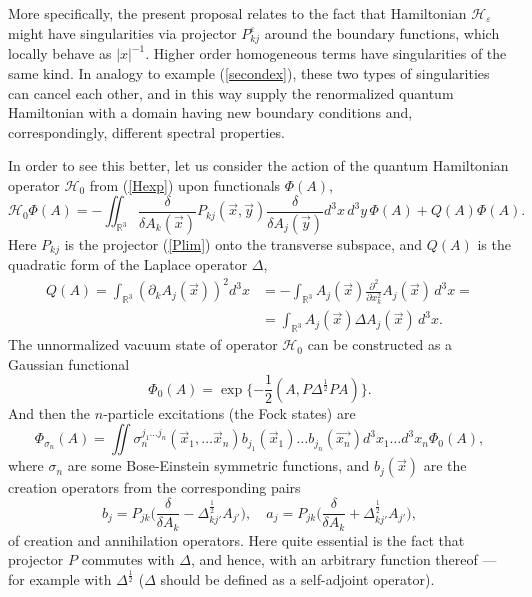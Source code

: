 \documentclass[12pt]{article}
\newcommand{\pl}{\partial}
\newcommand{\HH}{\mathscr{H}}
\newcommand{\RR}{\mathbb{R}}
\newcommand{\ve}{\varepsilon}
\begin{document}
    More specifically, the present proposal relates to the fact that    
    Hamiltonian
$ \HH_{\ve} $
	might have singularities via projector
$ P_{kj}^{\ve} $
    around the boundary functions,
	which locally behave as
$ |x|^{-1} $.
	Higher order homogeneous terms have singularities of the same kind.
	In analogy to example
(\ref{secondex}),
	these two types of singularities can cancel each other,
	and in this way supply the renormalized quantum Hamiltonian
	with a domain having new boundary conditions and, correspondingly,
	different spectral properties.

	In order to see this better, let us consider the action
	of the quantum Hamiltonian operator
$ \HH_{0} $ from
(\ref{Hexp})
	upon functionals
$ \Phi(A) $,
\begin{equation}
\label{qH0}
    \HH_{0}\Phi(A) = - \iint_{\RR^{3}} \frac{\delta}{\delta A_{k}(\vec{x})}
	P_{kj}(\vec{x},\vec{y}) \frac{\delta}{\delta A_{j}(\vec{y})}
	    d^{3}x \,d^{3}y \, \Phi(A)
	+ Q(A) \Phi(A) .
\end{equation}
	Here
$ P_{kj} $
	is the projector
(\ref{Plim})
	onto the transverse subspace, and
$ Q(A) $
	is the quadratic form of the Laplace operator
$ \Delta $,
\begin{align}
\nonumber
    Q(A) = \int_{\RR^{3}} (\pl_{k}A_{j}(\vec{x}))^{2} d^{3}x
	&= - \int_{\RR^{3}} A_{j}(\vec{x}) \frac{\pl^{2}}{\pl x_{k}^{2}}
	A_{j}(\vec{x})\, d^{3} x =\\
\label{QA}
	&= \int_{\RR^{3}} A_{j}(\vec{x}) \Delta A_{j}(\vec{x}) \, d^{3}x .
\end{align}
    The unnormalized vacuum state of operator
$ \HH_{0} $
    can be constructed as a Gaussian functional
\begin{equation}
\label{Phi0}
    \Phi_{0}(A) = \exp\{-\frac{1}{2}(A,P\Delta^{\frac{1}{2}}PA)\} .
\end{equation}
    And then the
$ n $-particle excitations (the Fock states)
    are
\begin{equation*}
\label{Phin}
    \Phi_{\sigma_{n}}(A) = \iint
    \sigma_{n}^{j_{1}\ldots j_{n}} (\vec{x}_{1},\ldots \vec{x}_{n})
	b_{j_{1}}(\vec{x}_{1}) \ldots b_{j_{n}}(\vec{x_{n}})
    d^{3}x_{1} \ldots d^{3}x_{n} \Phi_{0}(A) ,
\end{equation*}
	where
$ \sigma_{n} $ are some Bose-Einstein symmetric functions, and
$ b_{j}(\vec{x}) $ are the creation operators from the corresponding pairs
\begin{equation*}
    b_{j} = P_{jk}\bigl(\frac{\delta}{\delta A_{k}}
	- \Delta^{\frac{1}{2}}_{kj'}A_{j'}\bigr) ,\quad
    a_{j} = P_{jk}\bigl(\frac{\delta}{\delta A_{k}}
	+ \Delta^{\frac{1}{2}}_{kj'} A_{j'} \bigr) ,
\end{equation*}
    	of creation and annihilation operators.
	Here quite essential is the fact that projector
$ P $
	commutes with
$ \Delta $,
	and hence, with an arbitrary function thereof ---
	for example with 
$ \Delta^{\frac{1}{2}} $
($ \Delta $ should be defined as a self-adjoint operator).
\end{document}
